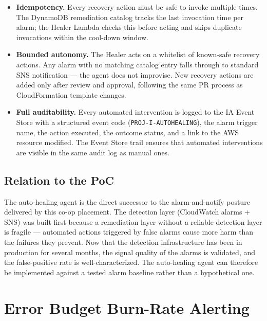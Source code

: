 \begin{itemize}
    \item \textbf{Idempotency.} Every recovery action must be safe to invoke
          multiple times. The DynamoDB remediation catalog tracks the last
          invocation time per alarm; the Healer Lambda checks this before
          acting and skips duplicate invocations within the cool-down window.

    \item \textbf{Bounded autonomy.} The Healer acts on a whitelist of
          known-safe recovery actions. Any alarm with no matching catalog
          entry falls through to standard SNS notification --- the agent
          does not improvise. New recovery actions are added only after
          review and approval, following the same PR process as
          CloudFormation template changes.

    \item \textbf{Full auditability.} Every automated intervention is
          logged to the IA Event Store with a structured event code
          (\texttt{PROJ-I-AUTOHEALING}), the alarm trigger name, the
          action executed, the outcome status, and a link to the AWS
          resource modified. The Event Store trail ensures that automated
          interventions are visible in the same audit log as manual ones.
\end{itemize}

\subsection{Relation to the PoC}

The auto-healing agent is the direct successor to the alarm-and-notify
posture delivered by this co-op placement. The detection layer (CloudWatch
alarms + SNS) was built first because a remediation layer without a
reliable detection layer is fragile --- automated actions triggered by
false alarms cause more harm than the failures they prevent. Now that the
detection infrastructure has been in production for several months, the
signal quality of the alarms is validated, and the false-positive rate
is well-characterized. The auto-healing agent can therefore be implemented against a
tested alarm baseline rather than a hypothetical one.


\section{Error Budget Burn-Rate Alerting}
\label{sec:future_error_budget}

